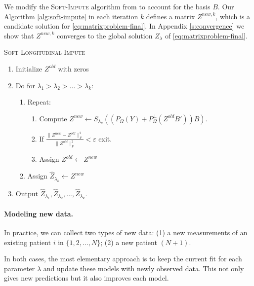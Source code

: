 \documentclass[preprint]{imsart}
\numberwithin{equation}{section}
\theoremstyle{plain}
\begin{document}
We modify the \textsc{Soft-Impute} algorithm from \citep{mazumder2010spectral} to account for the basis $B$. %
Our Algorithm \ref{alg:soft-impute} in each iteration $k$ defines a matrix $Z^{new,k}$, which is a candidate solution for \eqref{eq:matrixproblem-final}. In Appendix \ref{s:convergence} we show that $Z^{new,k}$ converges to the global solution $Z_\lambda$ of \eqref{eq:matrixproblem-final}.

\begin{algorithm}
\caption{\textsc{Soft-Longitudinal-Impute}\label{alg:soft-impute}}
\begin{enumerate}
\item Initialize $Z^{old}$ with zeros
\item Do for $\lambda_1 > \lambda_2 > ... > \lambda_k$:
\begin{enumerate}
\item Repeat:
\begin{enumerate}
\item Compute $Z^{new} \leftarrow S_{\lambda_k}( (P_\Omega(Y) + P_\Omega^\perp(Z^{old}B'))B )$.
\item If $\frac{\|Z^{new} - Z^{old}\|_F^2}{\|Z^{old}\|_F^2} < \varepsilon$ exit.
\item Assign $Z^{old} \leftarrow Z^{new}$
\end{enumerate}
\item Assign $\hat{Z}_{\lambda_k} \leftarrow Z^{new}$
\end{enumerate}
\item Output $\hat{Z}_{\lambda_1}, \hat{Z}_{\lambda_2}, ... , \hat{Z}_{\lambda_k}$.
\end{enumerate}
\end{algorithm}

\paragraph{Modeling new data.}

In practice, we can collect two types of new data: (1) a new measurements of an existing patient $i$ in $\{1,2,...,N\}$; (2) a new patient $(N+1)$.

In both cases, the most elementary approach is to keep the current fit for each parameter $\lambda$ and update these models with newly observed data. This not only gives new predictions but it also improves each model. 
\end{document}
